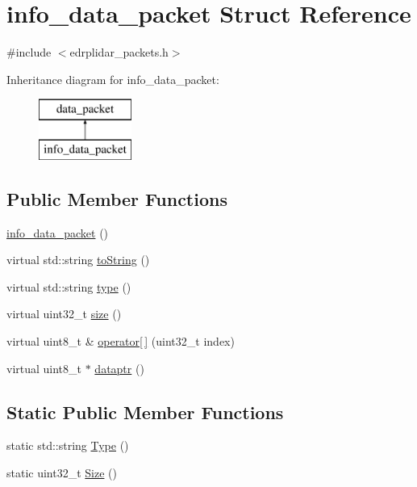 \hypertarget{structinfo__data__packet}{\section{info\-\_\-data\-\_\-packet Struct Reference}
\label{structinfo__data__packet}
}


{\ttfamily \#include $<$edrplidar\-\_\-packets.\-h$>$}

Inheritance diagram for info\-\_\-data\-\_\-packet\-:\begin{figure}[H]
\begin{center}
\leavevmode
\includegraphics[height=2.000000cm]{structinfo__data__packet}
\end{center}
\end{figure}
\subsection*{Public Member Functions}
\begin{DoxyCompactItemize}
\item 
\hyperlink{structinfo__data__packet_afb9145aa395f640ad423624ea72730f5}{info\-\_\-data\-\_\-packet} ()
\item 
virtual std\-::string \hyperlink{structinfo__data__packet_a8c8b12d30a12b931740eb9c4cdc84315}{to\-String} ()
\item 
virtual std\-::string \hyperlink{structinfo__data__packet_a85dfeae92d487d55b6d57e95e0c2b662}{type} ()
\item 
virtual uint32\-\_\-t \hyperlink{structinfo__data__packet_a8852d00d040d27ba824dc333a8f66f44}{size} ()
\item 
virtual uint8\-\_\-t \& \hyperlink{structinfo__data__packet_a5a78a794ee110ed9bb4a4bb97d57f9f3}{operator\mbox{[}$\,$\mbox{]}} (uint32\-\_\-t index)
\item 
virtual uint8\-\_\-t $\ast$ \hyperlink{structinfo__data__packet_a2b730e457ee372ad1d40d4bbc22928cc}{dataptr} ()
\end{DoxyCompactItemize}
\subsection*{Static Public Member Functions}
\begin{DoxyCompactItemize}
\item 
static std\-::string \hyperlink{structinfo__data__packet_ad2f7f5bdfe8084400875436242fe9838}{Type} ()
\item 
static uint32\-\_\-t \hyperlink{structinfo__data__packet_a1dc781165e90e09e29fab25f6b9cfeb1}{Size} ()
\end{DoxyCompactItemize}
